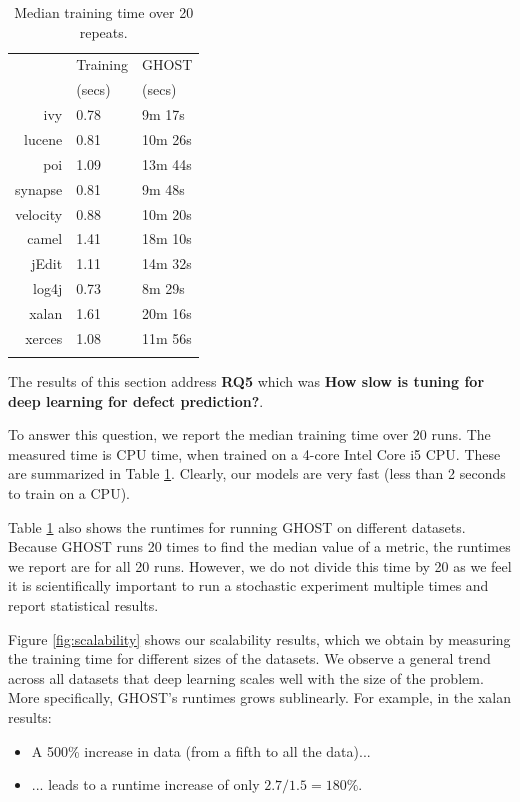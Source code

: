 \documentclass[10pt,compsoc,twocolumn]{IEEEtran}
\newcommand{\bi}{\begin{itemize}}
\newcommand{\ei}{\end{itemize}}
\begin{document}
\begin{table}
    \centering
    \caption{Median training time over 20 repeats.}
    \scriptsize
    \begin{tabular}{rll}
        \toprule
          & Training   & GHOST   \\
           &   (secs) &  (secs) \\
        \midrule
        ivy & 0.78 & 9m 17s \\
        lucene & 0.81 & 10m 26s \\
        poi & 1.09 & 13m 44s \\
        synapse & 0.81 & 9m 48s \\
        velocity & 0.88 & 10m 20s \\
        camel & 1.41 & 18m 10s \\
        jEdit & 1.11 & 14m 32s\\
        log4j & 0.73 & 8m 29s\\
        xalan & 1.61 & 20m 16s\\
        xerces & 1.08 & 11m 56s \\
        \bottomrule \\
    \end{tabular}
    \label{tab:runtimes}
\end{table}The results of this section address \textbf{RQ5} which was \textbf{How slow is tuning for deep learning for defect prediction?}.

To answer this question, we report the median training time over 20 runs. The measured time is CPU time, when trained on a 4-core Intel Core i5 CPU. These are summarized in Table \ref{tab:runtimes}. Clearly, our models are very fast (less than 2 seconds to train on a CPU).

Table \ref{tab:runtimes} also shows the runtimes for running GHOST on different datasets. Because GHOST runs 20 times to find the median value of a metric, the runtimes we report are for all 20 runs. However, we do not divide this time by 20 as we feel it is scientifically important to run a stochastic experiment multiple times and report statistical results.

Figure \ref{fig:scalability} shows our scalability results, which we obtain by measuring the training time for different sizes of the datasets.
We observe a general trend across all datasets that deep learning scales well with the size of the problem. More specifically,  GHOST's runtimes grows sublinearly. For example, in the xalan results:
\bi
\item A 500\% increase in data   (from a fifth to all the data)...
\item ... leads to a runtime increase of   only    $2.7/1.5 = 180\%$.
\ei
\end{document}
